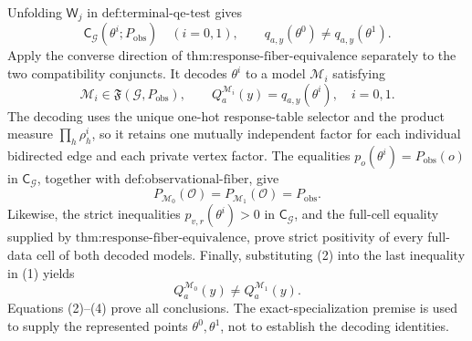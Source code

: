 Unfolding \(\mathsf W_j\) in \(\text{def:terminal-qe-test}\) gives
\[
\mathsf C_{\mathcal G}(\theta^i;P_{\mathrm{obs}})
\quad(i=0,1),
\qquad
q_{a,y}(\theta^0)\neq q_{a,y}(\theta^1).
\tag{1}
\]
Apply the converse direction of \(\text{thm:response-fiber-equivalence}\) separately to the two compatibility conjuncts.  It decodes \(\theta^i\) to a model \(\mathcal M_i\) satisfying
\[
\mathcal M_i\in\mathfrak F(\mathcal G,P_{\mathrm{obs}}),
\qquad
Q_a^{\mathcal M_i}(y)=q_{a,y}(\theta^i),
\quad i=0,1.
\tag{2}
\]
The decoding uses the unique one-hot response-table selector and the product measure \(\prod_h\rho_h^i\), so it retains one mutually independent factor for each individual bidirected edge and each private vertex factor.  The equalities \(p_o(\theta^i)=P_{\mathrm{obs}}(o)\) in \(\mathsf C_{\mathcal G}\), together with \(\text{def:observational-fiber}\), give
\[
P_{\mathcal M_0}(\mathcal O)=P_{\mathcal M_1}(\mathcal O)=P_{\mathrm{obs}}.
\tag{3}
\]
Likewise, the strict inequalities \(p_{v,r}(\theta^i)>0\) in \(\mathsf C_{\mathcal G}\), and the full-cell equality supplied by \(\text{thm:response-fiber-equivalence}\), prove strict positivity of every full-data cell of both decoded models.  Finally, substituting (2) into the last inequality in (1) yields
\[
Q_a^{\mathcal M_0}(y)\neq Q_a^{\mathcal M_1}(y).
\tag{4}
\]
Equations (2)--(4) prove all conclusions.  The exact-specialization premise is used to supply the represented points \(\theta^0,\theta^1\), not to establish the decoding identities.